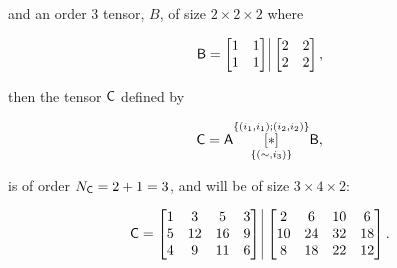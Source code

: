 and an order 3 tensor, $B$, of size $2\times2\times2$ where

\begin{equation}
\tens{B} = \begin{bmatrix}
1 & 1 \\
1 & 1\\
\end{bmatrix}\, \vline \, \begin{bmatrix}
2 & 2 \\
2 & 2\\
\end{bmatrix},
\end{equation}

then the tensor $\mathsf{C}$ defined by

\begin{equation}
\mathsf{C} = \mathsf{A} \underset{\lbrace(\sim,i_3)\rbrace}{\overset{\lbrace (i_1,i_1);(i_2,i_2)\rbrace}{[ \ast ]}} {\mathsf{B}},
\end{equation}

is of order $N_{\mathsf{C}}=2+1 = 3$, and will be of size $3 \times 4 \times 2$:

\begin{equation}
\tens{C} = \begin{bmatrix}
1 & 3 & 5 & 3 \\
5 & 12 & 16 & 9\\
4 & 9 & 11 & 6
\end{bmatrix} \, \vline \, \begin{bmatrix}
2 & 6 & 10 & 6 \\
10 & 24 & 32 & 18\\
8 & 18 & 22 & 12
\end{bmatrix}.
\end{equation}
